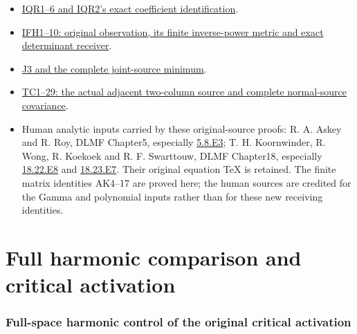 \documentclass[11pt]{article}
\begin{document}
\begin{itemize}
\tightlist
\item
  \href{https://github.com/KokunoYumeto/zeta-function-research-reader/blob/ab120cf974feb26a31d77b07458b6da52f912ea4/workbenches/splitzero-tandem/continuations/20260921-inverse-quotient/INVERSE_QUOTIENT_RECEIVERS.tex}{IQR1--6 and IQR2's exact coefficient identification}.
\item
  \href{https://github.com/KokunoYumeto/zeta-function-research-reader/blob/edd4008690952fb8568a01744e49ad7e180401e9/workbenches/splitzero-tandem/continuations/20260921-original-observation/INVERSE_FLAG_AND_RELATIVE_HEAT.tex}{IFH1--10: original observation, its finite inverse-power metric and exact determinant receiver}.
\item
  \href{https://github.com/KokunoYumeto/zeta-function-research-reader/blob/f1ad8be11f329a12d562420edfa58fa464948ee2/workbenches/splitzero-tandem/continuations/20260921-uniform-source-family/JOINT_MINIMUM_COMPLETE.tex\#L634}{J3 and the complete joint-source minimum}.
\item
  \href{https://github.com/KokunoYumeto/zeta-function-research-reader/blob/f1ad8be11f329a12d562420edfa58fa464948ee2/workbenches/splitzero-tandem/continuations/20260921-uniform-source-family/TWO_COLUMN_ACTUAL_UPDATE.md}{TC1--29: the actual adjacent two-column source and complete normal-source covariance}.
\item
  Human analytic inputs carried by these original-source proofs: R. A. Askey and R. Roy, DLMF Chapter5, especially \href{https://dlmf.nist.gov/5.8.E3}{5.8.E3}; T. H. Koornwinder, R. Wong, R. Koekoek and R. F. Swarttouw, DLMF Chapter18, especially \href{https://dlmf.nist.gov/18.22.E8}{18.22.E8} and \href{https://dlmf.nist.gov/18.23.E7}{18.23.E7}. Their original equation TeX is retained. The finite matrix identities AK4--17 are proved here; the human sources are credited for the Gamma and polynomial inputs rather than for these new receiving identities.
\end{itemize}


\clearpage\part{Full harmonic comparison and critical activation}
\section{Full-space harmonic control of the original critical activation}\label{full-space-harmonic-control-of-the-original-critical-activation}
\end{document}
